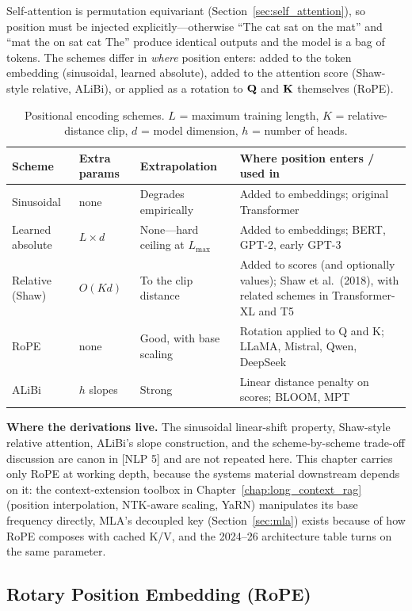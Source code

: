 Self-attention is permutation equivariant (Section~\ref{sec:self_attention}), so position must be injected explicitly---otherwise ``The cat sat on the mat'' and ``mat the on sat cat The'' produce identical outputs and the model is a bag of tokens. The schemes differ in \textit{where} position enters: added to the token embedding (sinusoidal, learned absolute), added to the attention score (Shaw-style relative, ALiBi), or applied as a rotation to $\mathbf{Q}$ and $\mathbf{K}$ themselves (RoPE).

\begin{table}[H]
\centering
\caption{Positional encoding schemes. $L$ = maximum training length, $K$ = relative-distance clip, $d$ = model dimension, $h$ = number of heads.}
\begin{tabularx}{\textwidth}{llXX}
\toprule
\textbf{Scheme} & \textbf{Extra params} & \textbf{Extrapolation} & \textbf{Where position enters / used in} \\
\midrule
Sinusoidal & none & Degrades empirically & Added to embeddings; original Transformer \\
Learned absolute & $L \times d$ & None---hard ceiling at $L_{\max}$ & Added to embeddings; BERT, GPT-2, early GPT-3 \\
Relative (Shaw) & $O(Kd)$ & To the clip distance & Added to scores (and optionally values); Shaw et al.\ (2018), with related schemes in Transformer-XL and T5 \\
RoPE & none & Good, with base scaling & Rotation applied to Q and K; LLaMA, Mistral, Qwen, DeepSeek \\
ALiBi & $h$ slopes & Strong & Linear distance penalty on scores; BLOOM, MPT \\
\bottomrule
\end{tabularx}
\end{table}

\textbf{Where the derivations live.} The sinusoidal linear-shift property, Shaw-style relative attention, ALiBi's slope construction, and the scheme-by-scheme trade-off discussion are canon in [NLP 5] and are not repeated here. This chapter carries only RoPE at working depth, because the systems material downstream depends on it: the context-extension toolbox in Chapter~\ref{chap:long_context_rag} (position interpolation, NTK-aware scaling, YaRN) manipulates its base frequency directly, MLA's decoupled key (Section~\ref{sec:mla}) exists because of how RoPE composes with cached K/V, and the 2024--26 architecture table turns on the same parameter.

\subsection{Rotary Position Embedding (RoPE)}

